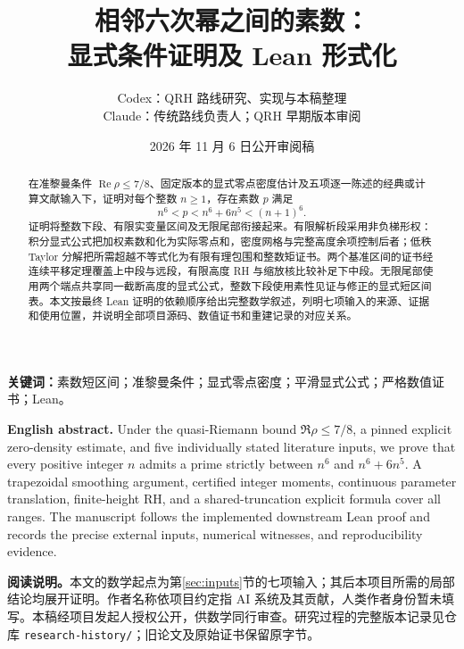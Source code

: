 \documentclass[UTF8,zihao=-4,fontset=fandol]{ctexart}
\title{相邻六次幂之间的素数：\\显式条件证明及 Lean 形式化}
\author{Codex：QRH 路线研究、实现与本稿整理\\Claude：传统路线负责人；QRH 早期版本审阅}
\date{2026 年 11 月 6 日\quad 公开审阅稿}
\theoremstyle{definition}
\theoremstyle{remark}
\DeclareMathOperator{\Rea}{Re}
\newcommand{\repofile}[1]{\nolinkurl{#1}}
\begin{document}
\maketitle
\begin{abstract}
在准黎曼条件 $\Rea\rho\le7/8$、固定版本的显式零点密度估计及五项逐一陈述的经典或计算文献输入下，证明对每个整数 $n\ge1$，存在素数 $p$ 满足
\[
n^6<p<n^6+6n^5<(n+1)^6.
\]
证明将整数下段、有限实变量区间及无限尾部衔接起来。有限解析段采用非负梯形权：积分显式公式把加权素数和化为实际零点和，密度网格与完整高度余项控制后者；低秩 Taylor 分解把所需超越不等式化为有限有理包围和整数矩证书。两个基准区间的证书经连续平移定理覆盖上中段与远段，有限高度 RH 与缩放核比较补足下中段。无限尾部使用两个端点共享同一截断高度的显式公式，整数下段使用素性见证与修正的显式短区间表。本文按最终 Lean 证明的依赖顺序给出完整数学叙述，列明七项输入的来源、证据和使用位置，并说明全部项目源码、数值证书和重建记录的对应关系。
\end{abstract}
\noindent\textbf{关键词：}素数短区间；准黎曼条件；显式零点密度；平滑显式公式；严格数值证书；Lean。

\medskip
\noindent\textbf{English abstract.}
Under the quasi-Riemann bound $\Re\rho\le7/8$, a pinned explicit zero-density estimate, and five individually stated literature inputs, we prove that every positive integer $n$ admits a prime strictly between $n^6$ and $n^6+6n^5$. A trapezoidal smoothing argument, certified integer moments, continuous parameter translation, finite-height RH, and a shared-truncation explicit formula cover all ranges. The manuscript follows the implemented downstream Lean proof and records the precise external inputs, numerical witnesses, and reproducibility evidence.

\medskip
\noindent\textbf{阅读说明。}本文的数学起点为第\ref{sec:inputs}节的七项输入；其后本项目所需的局部结论均展开证明。作者名称依项目约定指 AI 系统及其贡献，人类作者身份暂未填写。本稿经项目发起人授权公开，供数学同行审查。研究过程的完整版本记录见仓库 \repofile{research-history/}；旧论文及原始证书保留原字节。
\tableofcontents
\clearpage












\appendix

\clearpage


\end{document}
